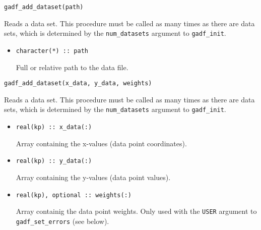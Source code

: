 \documentclass{article}
\begin{document}
\begin{verbatim}
gadf_add_dataset(path)
\end{verbatim}
Reads a data set. This procedure must be called as many times as there are data sets, which is determined by the \verb+num_datasets+ argument to \verb+gadf_init+.
\begin{itemize}
\item
\begin{verbatim}
character(*) :: path
\end{verbatim}
  Full or relative path to the data file.
\end{itemize}

\begin{verbatim}
gadf_add_dataset(x_data, y_data, weights)
\end{verbatim}
Reads a data set. This procedure must be called as many times as there are data sets, which is determined by the \verb+num_datasets+ argument to \verb+gadf_init+.
\begin{itemize}
\item
\begin{verbatim}
real(kp) :: x_data(:)
\end{verbatim}
  Array containing the x-values (data point coordinates).
\item
\begin{verbatim}
real(kp) :: y_data(:)
\end{verbatim}
  Array containing the y-values (data point values).
\item
\begin{verbatim}
real(kp), optional :: weights(:)
\end{verbatim}
  Array containig the data point weights. Only used with the \texttt{USER} argument to \verb+gadf_set_errors+ (see below).
\end{itemize}
\end{document}
